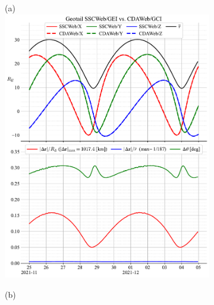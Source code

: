 \documentclass[draft]{agujournal2019}
\begin{document}
\clearpage
\begin{figure}[h]
     \begin{subfigure}[b]{0.49\textwidth}
         (a)
         \centering
         \includegraphics[width=\textwidth]{code/figures/ephemeris/Geotail_SSCWeb-GEI_vs_CDAWeb-GCI.pdf}
     \end{subfigure}
     \begin{subfigure}[b]{0.49\textwidth}
         (b)
         \centering

\end{subfigure}
\end{figure}
\end{document}
